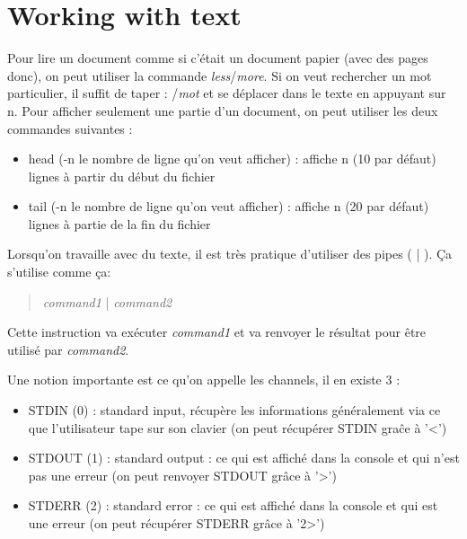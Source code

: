\documentclass{article}
\begin{document}
\newpage
\section{Working with text}
Pour lire un document comme si c'était un document papier (avec des pages donc), on peut utiliser la commande \textit{less}/\textit{more}. Si on veut rechercher un mot particulier, il suffit de taper : /\textit{mot} et se déplacer dans le texte en appuyant sur n.\newline
Pour afficher seulement une partie d'un document, on peut utiliser les deux commandes suivantes :
\begin{itemize}
    \item head (-n le nombre de ligne qu'on veut afficher) : affiche n (10 par défaut) lignes à partir du début du fichier
    \item tail (-n le nombre de ligne qu'on veut afficher) : affiche n (20 par défaut) lignes à partie de la fin du fichier 
\end{itemize}

\noindent Lorsqu'on travaille avec du texte, il est très pratique d'utiliser des pipes ( | ). Ça s'utilise comme ça:
\begin{quote}
    \textit{command1} | \textit{command2}
\end{quote}
\noindent Cette instruction va exécuter \textit{command1} et va renvoyer le résultat pour être utilisé par \textit{command2}.

Une notion importante est ce qu'on appelle les channels, il en existe 3 :
\begin{itemize}
    \item STDIN (0) : standard input, récupère les informations généralement via ce que l'utilisateur tape sur son clavier (on peut récupérer STDIN graĉe à '<')
    \item STDOUT (1) : standard output : ce qui est affiché dans la console et qui n'est pas une erreur (on peut renvoyer STDOUT grâce à '>')
    \item STDERR (2) : standard error : ce qui est affiché dans la console et qui est une erreur (on peut récupérer STDERR grâce à '2>')
\end{itemize}
\end{document}
